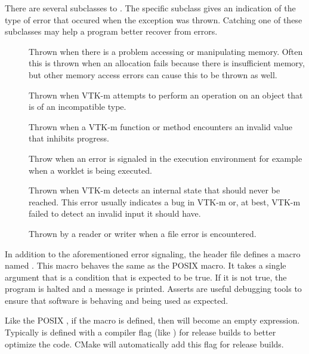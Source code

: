 
There are several subclasses to . The specific subclass
gives an indication of the type of error that occured when the exception
was thrown. Catching one of these subclasses may help a program better
recover from errors.
\begin{description}
\item[] Thrown when there is a problem
  accessing or manipulating memory. Often this is thrown when an allocation
  fails because there is insufficient memory, but other memory access
  errors can cause this to be thrown as well.
\item[] Thrown when VTK-m attempts to perform
  an operation on an object that is of an incompatible type.
\item[] Thrown when a VTK-m function or
  method encounters an invalid value that inhibits progress.
\item[]  Throw
  when an error is signaled in the execution environment for example when a
  worklet is being executed.
\item[] Thrown when VTK-m detects an
  internal state that should never be reached. This error usually indicates
  a bug in VTK-m or, at best, VTK-m failed to detect an invalid input it
  should have.
\item[] Thrown by a reader or writer when a file error is
  encountered.
\end{description}



In addition to the aforementioned error signaling, the
 header file defines a macro named
. This macro behaves the same as the POSIX
 macro. It takes a single argument that is a condition
that is expected to be true. If it is not true, the program is halted and a
message is printed. Asserts are useful debugging tools to ensure that
software is behaving and being used as expected.


\begin{didyouknow}
  Like the POSIX , if the  macro is
  defined, then  will become an empty expression.
  Typically  is defined with a compiler flag (like
  ) for release builds to better optimize the code.
  CMake will automatically add this flag for release builds.
\end{didyouknow}

